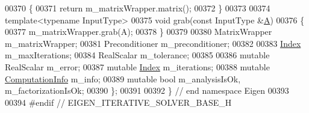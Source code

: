 \begin{DoxyCode}
00370 \textcolor{keyword}{  }\{
00371     \textcolor{keywordflow}{return} m\_matrixWrapper.matrix();
00372   \}
00373   
00374   \textcolor{keyword}{template}<\textcolor{keyword}{typename} InputType>
00375   \textcolor{keywordtype}{void} grab(\textcolor{keyword}{const} InputType &\hyperlink{group___core___module_class_eigen_1_1_matrix}{A})
00376   \{
00377     m\_matrixWrapper.grab(A);
00378   \}
00379   
00380   MatrixWrapper m\_matrixWrapper;
00381   Preconditioner m\_preconditioner;
00382 
00383   \hyperlink{namespace_eigen_a62e77e0933482dafde8fe197d9a2cfde}{Index} m\_maxIterations;
00384   RealScalar m\_tolerance;
00385   
00386   \textcolor{keyword}{mutable} RealScalar m\_error;
00387   \textcolor{keyword}{mutable} \hyperlink{namespace_eigen_a62e77e0933482dafde8fe197d9a2cfde}{Index} m\_iterations;
00388   \textcolor{keyword}{mutable} \hyperlink{group__enums_ga85fad7b87587764e5cf6b513a9e0ee5e}{ComputationInfo} m\_info;
00389   \textcolor{keyword}{mutable} \textcolor{keywordtype}{bool} m\_analysisIsOk, m\_factorizationIsOk;
00390 \};
00391 
00392 \} \textcolor{comment}{// end namespace Eigen}
00393 
00394 \textcolor{preprocessor}{#endif // EIGEN\_ITERATIVE\_SOLVER\_BASE\_H}
\end{DoxyCode}

